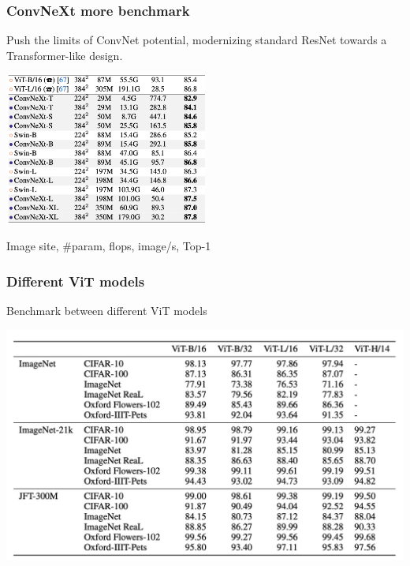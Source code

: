 \begin{frame}
\frametitle{ConvNeXt more benchmark}
Push the limits of ConvNet potential, modernizing  standard ResNet towards a Transformer-like design.

\begin{center}
    \includegraphics[width=0.5\textwidth]{img/4-section/ConvNext2.png}
\end{center}

Image site, \#param, flops, image/s, Top-1

\end{frame}




\begin{frame}
\frametitle{Different ViT models}
Benchmark between different ViT models
\begin{center}
    \includegraphics[width=1\textwidth]{img/4-section/More-benchmark_2.png}
\end{center}

\end{frame}


